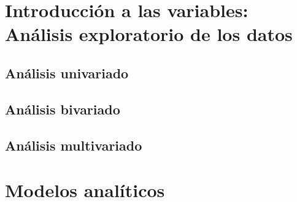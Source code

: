 \documentclass[a4paper]{article}
\begin{document}
\section{Introducción a las variables: Análisis exploratorio de los datos}

    \subsection{Análisis univariado}

    \subsection{Análisis bivariado}

    \subsection{Análisis multivariado}

\section{Modelos analíticos}
\end{document}
